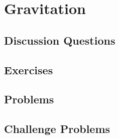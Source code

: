 
\chapter{Gravitation}

\section{Discussion Questions}

\section{Exercises}

\section{Problems}

\section{Challenge Problems}
